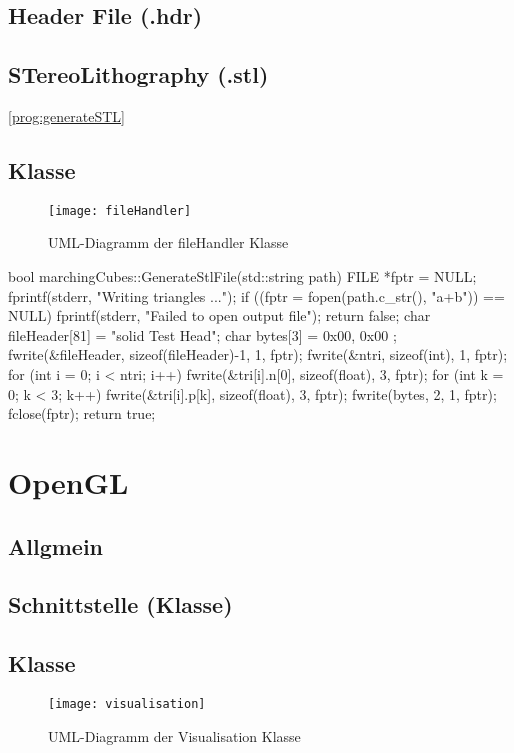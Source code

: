 \subsection{Header File (.hdr)}

\subsection{STereoLithography (.stl)}
\ref{prog:generateSTL}
\subsection{Klasse}
\begin{figure}[H]
	\centering
	\texttt{[image: fileHandler]}
	\caption{UML-Diagramm der fileHandler Klasse}
	\label{fig:fileHandler}
\end{figure}
\begin{program}
	\caption{Generierung einer STL-Datei}
	\label{prog:generateSTL}
	\begin{CCode}
	bool marchingCubes::GenerateStlFile(std::string path){
		FILE *fptr = NULL;
		fprintf(stderr, "Writing triangles ...\n");
		if ((fptr = fopen(path.c_str(), "a+b")) == NULL) {
			fprintf(stderr, "Failed to open output file\n");
			return false;
		}
		char fileHeader[81] = "solid Test Head";
		char bytes[3] = { 0x00, 0x00 };
		fwrite(&fileHeader, sizeof(fileHeader)-1, 1, fptr);
		fwrite(&ntri, sizeof(int), 1, fptr);
		for (int i = 0; i < ntri; i++) {
			fwrite(&tri[i].n[0], sizeof(float), 3, fptr);
			for (int k = 0; k < 3; k++)  {
				fwrite(&tri[i].p[k], sizeof(float), 3, fptr);
			}
			fwrite(bytes, 2, 1, fptr);
		}
		fclose(fptr);
		return true;
	}
	\end{CCode}
\end{program}

\section{OpenGL}
\subsection{Allgmein}
\subsection{Schnittstelle (Klasse)}
\subsection{Klasse}
\begin{figure}[H]
	\centering
	\texttt{[image: visualisation]}
	\caption{UML-Diagramm der Visualisation Klasse}
	\label{fig:visualisation}
\end{figure}

